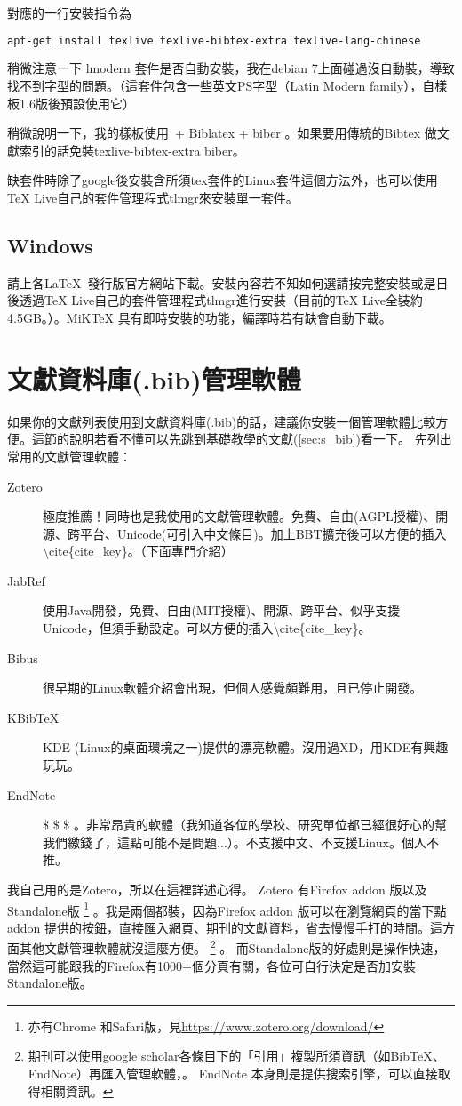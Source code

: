 \documentclass[class=NCU_thesis, crop=false, float=true]{standalone}
\begin{document}
對應的一行安裝指令為
\begin{lstlisting}[style=consoleStyle,language=bash]
apt-get install texlive texlive-bibtex-extra texlive-lang-chinese
\end{lstlisting}

稍微注意一下 lmodern 套件是否自動安裝，我在debian 7上面碰過沒自動裝，導致找不到字型的問題。（這套件包含一些英文PS字型（Latin Modern family），自樣板1.6版後預設使用它）

稍微說明一下，我的樣板使用\XeLaTeX\  + Biblatex + biber 。如果要用傳統的Bibtex 做文獻索引的話免裝texlive-bibtex-extra biber。

缺套件時除了google後安裝含所須tex套件的Linux套件這個方法外，也可以使用TeX Live自己的套件管理程式tlmgr來安裝單一套件。

\subsection{Windows}
請上各\LaTeX\ 發行版官方網站下載。安裝內容若不知如何選請按完整安裝或是日後透過TeX Live自己的套件管理程式tlmgr進行安裝（目前的TeX Live全裝約4.5GB。）。MiKTeX 具有即時安裝的功能，編譯時若有缺會自動下載。

\section{文獻資料庫(.bib)管理軟體}
如果你的文獻列表使用到文獻資料庫(.bib)的話，建議你安裝一個管理軟體比較方便。這節的說明若看不懂可以先跳到基礎教學的文獻(\cref{sec:s_bib})看一下。
先列出常用的文獻管理軟體：
\begin{description}
    \item[Zotero] 極度推薦！同時也是我使用的文獻管理軟體。免費、自由(AGPL授權)、開源、跨平台、Unicode(可引入中文條目)。加上BBT擴充後可以方便的插入\textbackslash{}cite\{cite\_key\}。（下面專門介紹）
    \item[JabRef] 使用Java開發，免費、自由(MIT授權)、開源、跨平台、似乎支援Unicode，但須手動設定。可以方便的插入\textbackslash{}cite\{cite\_key\}。
    \item[Bibus] 很早期的Linux軟體介紹會出現，但個人感覺頗難用，且已停止開發。
    \item[KBibTeX] KDE (Linux的桌面環境之一)提供的漂亮軟體。沒用過XD，用KDE有興趣玩玩。
    \item[EndNote] \$ \$ \$ 。非常昂貴的軟體（我知道各位的學校、研究單位都已經很好心的幫我們繳錢了，這點可能不是問題...）。不支援中文、不支援Linux。個人不推。
\end{description}
我自己用的是Zotero，所以在這裡詳述心得。
Zotero 有Firefox addon 版以及Standalone版
\footnote{亦有Chrome 和Safari版，見\url{https://www.zotero.org/download/}}
。我是兩個都裝，因為Firefox addon 版可以在瀏覽網頁的當下點addon 提供的按鈕，直接匯入網頁、期刊的文獻資料，省去慢慢手打的時間。這方面其他文獻管理軟體就沒這麼方便。
\footnote{期刊可以使用google scholar各條目下的「引用」複製所須資訊（如BibTeX、EndNote）再匯入管理軟體，。 EndNote 本身則是提供搜索引擎，可以直接取得相關資訊。}
。
而Standalone版的好處則是操作快速，當然這可能跟我的Firefox有1000+個分頁有關，各位可自行決定是否加安裝Standalone版。
\end{document}
